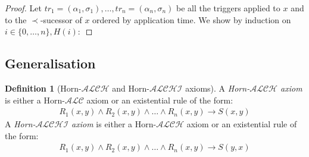 \documentclass{article}
\theoremstyle{definition}
\newtheorem{definition}{Definition}[section]
\newtheorem{theorem}{Theorem}[section]
\theoremstyle{remark}
\begin{document}
\begin{proof}
Let $tr_1 = (\alpha_1,\sigma_1),\ldots, tr_n =(\alpha_n,\sigma_n)$ be all the triggers applied to $x$ and to the  $\prec$-sucessor of $x$ ordered by application time. We show by induction on $i \in \{0,\ldots, n\},H(i):$ 


%
\end{proof}

\subsection{Generalisation}

\begin{definition}[Horn-$\mathcal{ALCH}$ and Horn-$\mathcal{ALCHI}$ axioms]
A \emph{Horn-$\mathcal{ALCH}$ axiom} is either a Horn-$\mathcal{ALC}$ axiom or an existential rule of the form:
\begin{align}
R_1(x,y) \wedge R_2(x,y) \wedge \ldots \wedge R_n(x,y) \rightarrow S(x,y)
\end{align}
A \emph{Horn-$\mathcal{ALCHI}$ axiom} is either a Horn-$\mathcal{ALCH}$ axiom or an existential rule of the form:
\begin{align}
R_1(x,y) \wedge R_2(x,y) \wedge \ldots \wedge R_n(x,y) \rightarrow S(y,x)
\end{align}

\end{definition}
\end{document}
